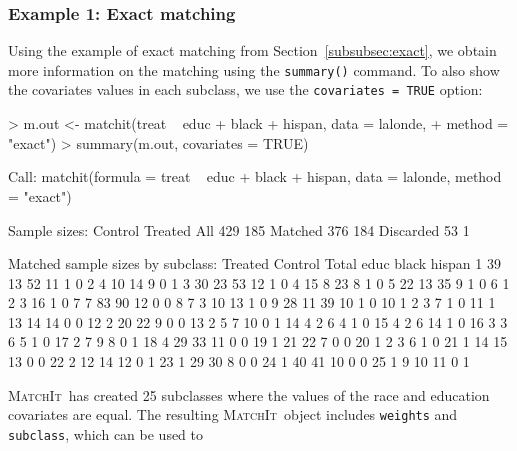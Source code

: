 \documentclass[oneside,letterpaper,titlepage]{article}
\newcommand{\MatchIt}{\textsc{MatchIt}}
\begin{document}
\subsubsection{Example 1: Exact matching}
\label{subsubsec:balanceexact}

Using the example of exact matching from
  Section~\ref{subsubsec:exact}, we obtain more information on the
  matching using the {\tt summary()} command.  To also show the
  covariates values in each subclass, we use the \texttt{covariates =
    TRUE} option:
\begin{Schunk}
\begin{Sinput}
> m.out <- matchit(treat ~ educ + black + hispan, data = lalonde, 
+     method = "exact")
> summary(m.out, covariates = TRUE)
\end{Sinput}
\begin{Soutput}
Call:
matchit(formula = treat ~ educ + black + hispan, data = lalonde, 
    method = "exact")

Sample sizes:
          Control Treated
All           429     185
Matched       376     184
Discarded      53       1

Matched sample sizes by subclass:
   Treated Control Total educ black hispan
1       39      13    52   11     1      0
2        4      10    14    9     0      1
3       30      23    53   12     1      0
4       15       8    23    8     1      0
5       22      13    35    9     1      0
6        1       2     3   16     1      0
7        7      83    90   12     0      0
8        7       3    10   13     1      0
9       28      11    39   10     1      0
10       1       2     3    7     1      0
11       1      13    14   14     0      0
12       2      20    22    9     0      0
13       2       5     7   10     0      1
14       4       2     6    4     1      0
15       4       2     6   14     1      0
16       3       3     6    5     1      0
17       2       7     9    8     0      1
18       4      29    33   11     0      0
19       1      21    22    7     0      0
20       1       2     3    6     1      0
21       1      14    15   13     0      0
22       2      12    14   12     0      1
23       1      29    30    8     0      0
24       1      40    41   10     0      0
25       1       9    10   11     0      1
\end{Soutput}
\end{Schunk}
\MatchIt\ has created 25 subclasses where the values of the race and
education covariates are equal.  The resulting \MatchIt\ object
includes \texttt{weights} and \texttt{subclass}, which can be used to
\end{document}
